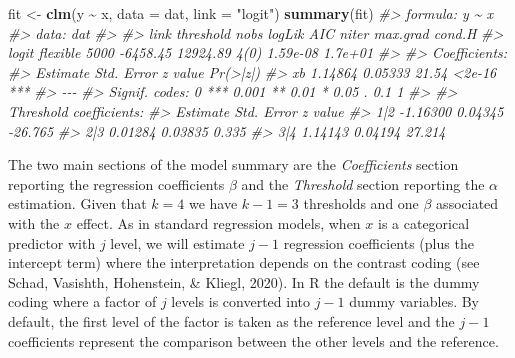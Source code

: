 \documentclass[
  man,floatsintext]{apa6}
\newenvironment{Shaded}{\begin{snugshade}}{\end{snugshade}}
\newcommand{\AttributeTok}[1]{\textcolor[rgb]{0.13,0.29,0.53}{#1}}
\newcommand{\CommentTok}[1]{\textcolor[rgb]{0.56,0.35,0.01}{\textit{#1}}}
\newcommand{\FunctionTok}[1]{\textcolor[rgb]{0.13,0.29,0.53}{\textbf{#1}}}
\newcommand{\NormalTok}[1]{#1}
\newcommand{\OtherTok}[1]{\textcolor[rgb]{0.56,0.35,0.01}{#1}}
\newcommand{\SpecialCharTok}[1]{\textcolor[rgb]{0.81,0.36,0.00}{\textbf{#1}}}
\newcommand{\StringTok}[1]{\textcolor[rgb]{0.31,0.60,0.02}{#1}}
\begin{document}
\begin{Shaded}
\begin{Highlighting}[]
\NormalTok{fit }\OtherTok{\textless{}{-}} \FunctionTok{clm}\NormalTok{(y }\SpecialCharTok{\textasciitilde{}}\NormalTok{ x, }\AttributeTok{data =}\NormalTok{ dat, }\AttributeTok{link =} \StringTok{"logit"}\NormalTok{)}
\FunctionTok{summary}\NormalTok{(fit)}
\CommentTok{\#\textgreater{} formula: y \textasciitilde{} x}
\CommentTok{\#\textgreater{} data:    dat}
\CommentTok{\#\textgreater{} }
\CommentTok{\#\textgreater{}  link  threshold nobs logLik   AIC      niter max.grad cond.H }
\CommentTok{\#\textgreater{}  logit flexible  5000 {-}6458.45 12924.89 4(0)  1.59e{-}08 1.7e+01}
\CommentTok{\#\textgreater{} }
\CommentTok{\#\textgreater{} Coefficients:}
\CommentTok{\#\textgreater{}    Estimate Std. Error z value Pr(\textgreater{}|z|)    }
\CommentTok{\#\textgreater{} xb  1.14864    0.05333   21.54   \textless{}2e{-}16 ***}
\CommentTok{\#\textgreater{} {-}{-}{-}}
\CommentTok{\#\textgreater{} Signif. codes:  0 \textquotesingle{}***\textquotesingle{} 0.001 \textquotesingle{}**\textquotesingle{} 0.01 \textquotesingle{}*\textquotesingle{} 0.05 \textquotesingle{}.\textquotesingle{} 0.1 \textquotesingle{} \textquotesingle{} 1}
\CommentTok{\#\textgreater{} }
\CommentTok{\#\textgreater{} Threshold coefficients:}
\CommentTok{\#\textgreater{}     Estimate Std. Error z value}
\CommentTok{\#\textgreater{} 1|2 {-}1.16300    0.04345 {-}26.765}
\CommentTok{\#\textgreater{} 2|3  0.01284    0.03835   0.335}
\CommentTok{\#\textgreater{} 3|4  1.14143    0.04194  27.214}
\end{Highlighting}
\end{Shaded}

\normalsize

The two main sections of the model summary are the \emph{Coefficients} section reporting the regression coefficients \(\beta\) and the \emph{Threshold} section reporting the \(\alpha\) estimation. Given that \(k = 4\) we have \(k - 1 = 3\) thresholds and one \(\beta\) associated with the \(x\) effect. As in standard regression models, when \(x\) is a categorical predictor with \(j\) level, we will estimate \(j - 1\) regression coefficients (plus the intercept term) where the interpretation depends on the contrast coding (see Schad, Vasishth, Hohenstein, \& Kliegl, 2020). In R the default is the dummy coding where a factor of \(j\) levels is converted into \(j - 1\) dummy variables. By default, the first level of the factor is taken as the reference level and the \(j - 1\) coefficients represent the comparison between the other levels and the reference.
\end{document}
